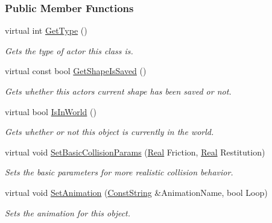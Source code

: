 \subsubsection*{Public Member Functions}
\begin{DoxyCompactItemize}
\item 
virtual int \hyperlink{classphys_1_1ActorBase_ab8bedea2ef0ce9194731ebeb886333ff}{GetType} ()
\begin{DoxyCompactList}\small\item\em Gets the type of actor this class is. \item\end{DoxyCompactList}\item 
virtual const bool \hyperlink{classphys_1_1ActorBase_ace1d04b4fbb21823cde3feee83d17c2f}{GetShapeIsSaved} ()
\begin{DoxyCompactList}\small\item\em Gets whether this actors current shape has been saved or not. \item\end{DoxyCompactList}\item 
virtual bool \hyperlink{classphys_1_1ActorBase_aaa18822e0966f8a4ede5695547eda801}{IsInWorld} ()
\begin{DoxyCompactList}\small\item\em Gets whether or not this object is currently in the world. \item\end{DoxyCompactList}\item 
virtual void \hyperlink{classphys_1_1ActorBase_ac60e1ebd1a08882234a6d04aff745260}{SetBasicCollisionParams} (\hyperlink{namespacephys_af7eb897198d265b8e868f45240230d5f}{Real} Friction, \hyperlink{namespacephys_af7eb897198d265b8e868f45240230d5f}{Real} Restitution)
\begin{DoxyCompactList}\small\item\em Sets the basic parameters for more realistic collision behavior. \item\end{DoxyCompactList}\item 
virtual void \hyperlink{classphys_1_1ActorBase_a1c84866a23fdf7598462839dddae3240}{SetAnimation} (\hyperlink{namespacephys_a5ce5049f8b4bf88d6413c47b504ebb31}{ConstString} \&AnimationName, bool Loop)
\begin{DoxyCompactList}\small\item\em Sets the animation for this object. \item\end{DoxyCompactList}\item 

\end{DoxyCompactItemize}
